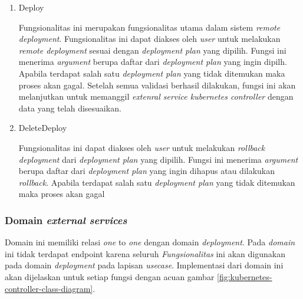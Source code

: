 \begin{enumerate}
  \item Deploy

        Fungsionalitas ini merupakan fungsionalitas utama dalam sistem \textit{remote deployment}. Fungsionalitas ini dapat diakses oleh \textit{user} untuk melakukan \textit{remote deployment} sesuai dengan \textit{deployment plan} yang dipilih. Fungsi ini menerima \textit{argument} berupa daftar dari \textit{deployment plan} yang ingin dipilh. Apabila terdapat salah satu \textit{deployment plan} yang tidak ditemukan maka proses akan gagal. Setelah semua validasi berhasil dilakukan, fungsi ini akan melanjutkan untuk memanggil \textit{extenral service kubernetes controller} dengan data yang telah disesuaikan.

  \item DeleteDeploy

        Fungsionalitas ini dapat diakses oleh \textit{user} untuk melakukan \textit{rollback deployment} dari \textit{deployment plan} yang dipilih. Fungsi ini menerima \textit{argument} berupa daftar dari \textit{deployment plan} yang ingin dihapus atau dilakukan \textit{rollback}. Apabila terdapat salah satu \textit{deployment plan} yang tidak ditemukan maka proses akan gagal

\end{enumerate}

\subsubsection{Domain \textit{external services}}

Domain ini memiliki relasi \textit{one} to \textit{one} dengan domain \textit{deployment}. Pada \textit{domain} ini tidak terdapat endpoint karena seluruh \textit{Fungsionalitas} ini akan digunakan pada domain \textit{deployment} pada lapisan \textit{usecase}. Implementasi dari domain ini akan dijelaskan untuk setiap fungsi dengan acuan gambar \ref{fig:kubernetes-controller-class-diagram}.


